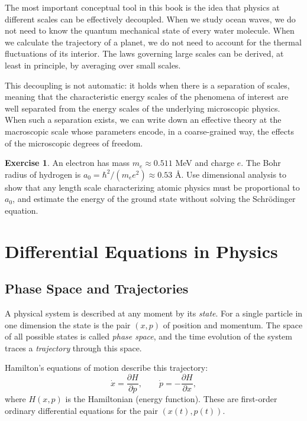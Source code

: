 \documentclass[12pt,a4paper,oneside]{book}
\theoremstyle{definition}
\newtheorem{exercise}{Exercise}[chapter]
\theoremstyle{plain}
\theoremstyle{remark}
\begin{document}
The most important conceptual tool in this book is the idea that physics at
different scales can be effectively decoupled. When we study ocean waves, we
do not need to know the quantum mechanical state of every water molecule. When
we calculate the trajectory of a planet, we do not need to account for the
thermal fluctuations of its interior. The laws governing large scales can be
derived, at least in principle, by averaging over small scales.

This decoupling is not automatic: it holds when there is a separation of scales,
meaning that the characteristic energy scales of the phenomena of interest are
well separated from the energy scales of the underlying microscopic physics.
When such a separation exists, we can write down an effective theory at the
macroscopic scale whose parameters encode, in a coarse-grained way, the effects
of the microscopic degrees of freedom.

\begin{exercise}
An electron has mass $m_e \approx 0.511$ MeV and charge $e$. The Bohr radius
of hydrogen is $a_0 = \hbar^2/(m_e e^2) \approx 0.53$ \AA. Use dimensional
analysis to show that any length scale characterizing atomic physics must be
proportional to $a_0$, and estimate the energy of the ground state without
solving the Schr\"odinger equation.
\end{exercise}

\chapter{Differential Equations in Physics}

\section{Phase Space and Trajectories}

A physical system is described at any moment by its \emph{state}. For a single
particle in one dimension the state is the pair $(x, p)$ of position and
momentum. The space of all possible states is called \emph{phase space}, and
the time evolution of the system traces a \emph{trajectory} through this space.

Hamilton's equations of motion describe this trajectory:
\begin{equation}
\dot x = \frac{\partial H}{\partial p}, \qquad
\dot p = -\frac{\partial H}{\partial x},
\end{equation}
where $H(x,p)$ is the Hamiltonian (energy function). These are first-order
ordinary differential equations for the pair $(x(t), p(t))$.
\end{document}
